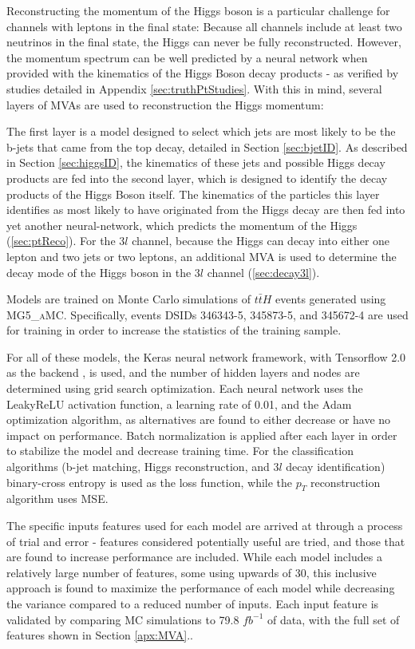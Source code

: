 Reconstructing the momentum of the Higgs boson is a particular challenge for channels with leptons in the final state: Because all channels include at least two neutrinos in the final state, the Higgs can never be fully reconstructed. However, the momentum spectrum can be well predicted by a neural network when provided with the kinematics of the Higgs Boson decay products - as verified by studies detailed in Appendix \ref{sec:truthPtStudies}. With this in mind, several layers of MVAs are used to reconstruction the Higgs momentum:

The first layer is a model designed to select which jets are most likely to be the b-jets that came from the top decay, detailed in Section \ref{sec:bjetID}. As described in Section \ref{sec:higgsID}, the kinematics of these jets and possible Higgs decay products are fed into the second layer, which is designed to identify the decay products of the Higgs Boson itself. The kinematics of the particles this layer identifies as most likely to have originated from the Higgs decay are then fed into yet another neural-network, which predicts the momentum of the Higgs (\ref{sec:ptReco}). For the $3l$  channel, because the Higgs can decay into either one lepton and two jets or two leptons, an additional MVA is used to determine the decay mode of the Higgs boson in the $3l$  channel (\ref{sec:decay3l}). 

Models are trained on Monte Carlo simulations of $t\bar{t}H$ events generated using \textsc{MG5\_aMC}. Specifically, events DSIDs 346343-5, 345873-5, and 345672-4 are used for training in order to increase the statistics of the training sample.

For all of these models, the Keras neural network framework, with Tensorflow 2.0 as the backend \cite{tensorflow}, is used, and the number of hidden layers and nodes are determined using grid search optimization. Each neural network uses the LeakyReLU activation function, a learning rate of 0.01, and the Adam optimization algorithm, as alternatives are found to either decrease or have no impact on performance. Batch normalization is applied after each layer in order to stabilize the model and decrease training time. For the classification algorithms (b-jet matching, Higgs reconstruction, and $3l$  decay identification) binary-cross entropy is used as the loss function, while the $p_T$ reconstruction algorithm uses MSE. 

The specific inputs features used for each model are arrived at through a process of trial and error - features considered potentially useful are tried, and those that are found to increase performance are included. While each model includes a relatively large number of features, some using upwards of 30, this inclusive approach is found to maximize the performance of each model while decreasing the variance compared to a reduced number of inputs. Each input feature is validated by comparing MC simulations to 79.8 $fb^{-1}$ of data, with the full set of features shown in Section \ref{apx:MVA}..

